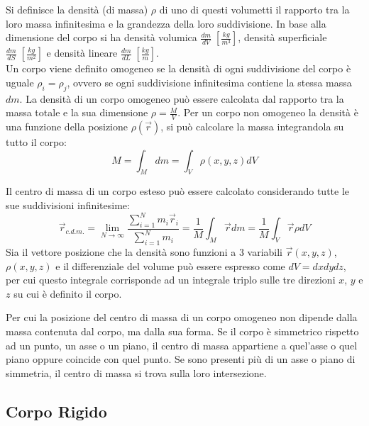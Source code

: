 \documentclass{article}
\numberwithin{equation}{subsection}
\begin{document}
Si definisce la densità (di massa) $\rho$ di uno 
di questi volumetti il rapporto tra la loro massa infinitesima e la 
grandezza della loro suddivisione. In base alla dimensione 
del corpo si ha densità volumica $\displaystyle\frac{dm}{dV}\;\left[\displaystyle\frac{kg}{m^3}\right]$, 
densità superficiale $\displaystyle\frac{dm}{dS}\;\left[\displaystyle\frac{kg}{m^2}\right]$ e densità 
lineare $\displaystyle\frac{dm}{dL}\;\left[\displaystyle\frac{kg}{m}\right]$. 
\\
Un corpo viene definito omogeneo se la densità di ogni 
suddivisione del corpo è uguale $\rho_i=\rho_j$, ovvero se ogni suddivisione infinitesima contiene la stessa massa $dm$. 
La densità di un corpo omogeneo può essere calcolata dal rapporto 
tra la massa totale e la sua dimensione $\rho=\displaystyle\frac{M}{V}$. 
Per un corpo non omogeneo la densità è una funzione della posizione $\rho(\vec{r})$, si può calcolare la massa integrandola su tutto il corpo: 
\begin{equation}
    M=\displaystyle\int_M dm=\int_V \rho(x,y,z) dV 
\end{equation}


Il centro di massa di un corpo esteso può essere calcolato considerando tutte le sue suddivisioni infinitesime: 
\begin{equation}
    \vec{r}_{c.d.m.}=\lim_{N\to\infty}\displaystyle\frac{\sum_{i=1}^{N}m_i\vec{r}_i}{\sum_{i=1}^{N}m_i}=\displaystyle\frac{1}{M}\int_M\vec{r}dm=\displaystyle\frac{1}{M}\int_V\vec{r}\rho dV
\end{equation}
Sia il vettore posizione che la densità sono funzioni a $3$ variabili $\vec{r}(x,y,z)$, $\rho(x,y,z)$ e il differenziale del volume può essere espresso come $dV=dxdydz$, per cui questo integrale corrisponde 
ad un integrale triplo sulle tre direzioni $x$, $y$ e $z$ su cui è definito il corpo. 


Per cui la posizione del centro di massa di un corpo omogeneo non dipende dalla massa contenuta dal corpo, ma dalla sua forma. Se il corpo è simmetrico rispetto ad un punto, un 
asse o un piano, il centro di massa appartiene a quel'asse o quel piano oppure coincide con quel punto. Se sono presenti più di un asse o piano di simmetria, il centro di massa 
si trova sulla loro intersezione. 

\subsection{Corpo Rigido}
\end{document}
